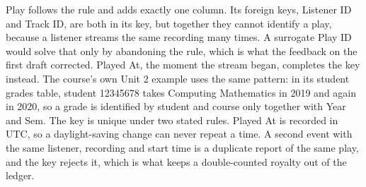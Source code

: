 \documentclass[11pt]{article}
\begin{document}
Play follows the rule and adds exactly one column. Its foreign keys, Listener ID and Track ID, are
both in its key, but together they cannot identify a play, because a listener streams the same
recording many times. A surrogate Play ID would solve that only by abandoning the rule, which is
what the feedback on the first draft corrected. Played At, the moment the stream began, completes
the key instead. The course's own Unit 2 example uses the same pattern: in its student grades table,
student 12345678 takes Computing Mathematics in 2019 and again in 2020, so a grade is identified by
student and course only together with Year and Sem. The key is unique under two stated rules.
Played At is recorded in UTC, so a daylight-saving change can never repeat a time. A second event
with the same listener, recording and start time is a duplicate report of the same play, and the
key rejects it, which is what keeps a double-counted royalty out of the ledger.
\end{document}
